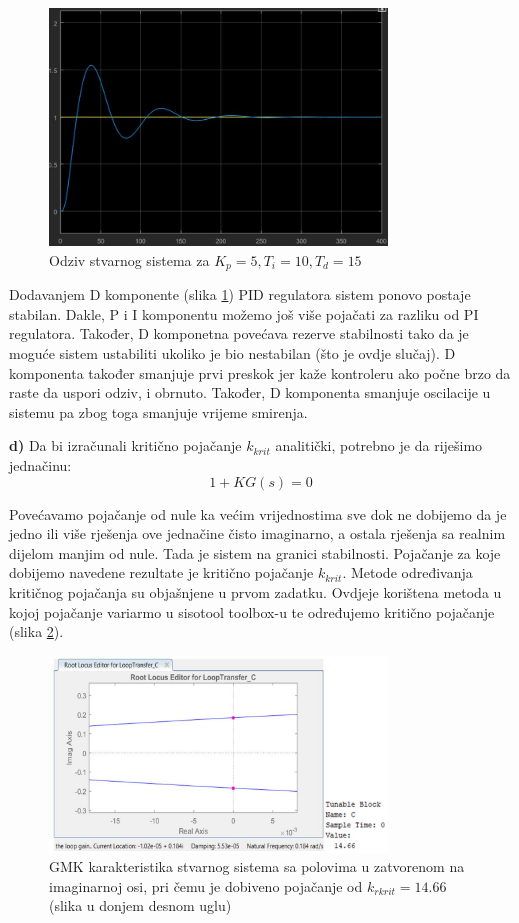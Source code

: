 \begin{figure} [H]
  \centering
  \includegraphics[width=0.8\textwidth]{z2_13}
  \caption{Odziv stvarnog sistema za $K_p=5, T_i=10, T_d=15$}
  \label{fig:z2_13}
\end{figure}
 
Dodavanjem D komponente (slika \ref{fig:z2_13}) PID regulatora sistem ponovo postaje stabilan. Dakle, P i I komponentu možemo još više pojačati za razliku od PI regulatora. Također, D komponetna povećava rezerve stabilnosti tako da je moguće sistem ustabiliti ukoliko je bio nestabilan (što je ovdje slučaj). D komponenta također smanjuje prvi preskok jer kaže kontroleru ako počne brzo da raste da uspori odziv, i obrnuto. Također, D komponenta smanjuje oscilacije u sistemu pa zbog toga smanjuje vrijeme smirenja.

\textbf{d)} Da bi izračunali kritično pojačanje $k_{krit}$ analitički, potrebno je da riješimo jednačinu:
	\[1+KG(s)=0\]

Povećavamo pojačanje od nule ka većim vrijednostima sve dok ne dobijemo da je jedno ili više rješenja ove jednačine čisto imaginarno, a ostala rješenja sa realnim dijelom manjim od nule. Tada je sistem na granici stabilnosti. Pojačanje za koje dobijemo navedene rezultate je kritično pojačanje $k_{krit}$. Metode određivanja kritičnog pojačanja su objašnjene u prvom zadatku. Ovdjeje korištena metoda u kojoj pojačanje variarmo u sisotool toolbox-u te određujemo kritično pojačanje (slika \ref{fig:z2_14}).

\begin{figure} [H]
  \centering
  \includegraphics[width=0.8\textwidth]{z2_14}
  \caption{GMK karakteristika stvarnog sistema sa polovima u zatvorenom na imaginarnoj osi, pri čemu je dobiveno pojačanje od $k_{rkrit}=14.66$ (slika u donjem desnom uglu)}
  \label{fig:z2_14}
\end{figure}

